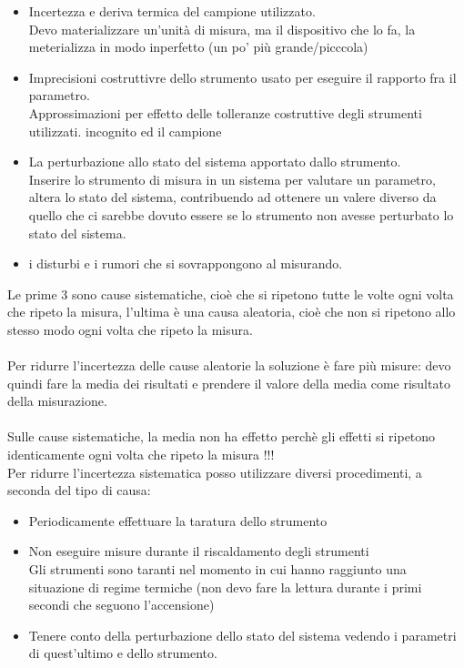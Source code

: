 \documentclass{article}
\begin{document}
\begin{itemize}
    \item Incertezza e deriva termica del campione utilizzato.\\
    Devo materializzare un'unità di misura, ma il dispositivo che lo fa, la meterializza in modo inperfetto (un po' più grande/picccola)
    \item Imprecisioni costruttivre dello strumento usato per eseguire il rapporto fra il parametro. \\
    Approssimazioni per effetto delle tolleranze costruttive degli strumenti utilizzati.
incognito ed il campione 
    \item La perturbazione allo stato del sistema apportato dallo strumento.\\
    Inserire lo strumento di misura in un sistema per valutare un parametro, altera lo stato del sistema, contribuendo ad ottenere un valere diverso da quello che ci sarebbe dovuto essere se lo strumento non avesse perturbato lo stato del sistema.
    \item i disturbi e i rumori che si sovrappongono al misurando.
\end{itemize}
Le prime 3 sono cause sistematiche, cioè che si ripetono tutte le volte ogni volta che ripeto la misura, l’ultima è una causa aleatoria, cioè che non si ripetono allo stesso modo ogni volta che ripeto la misura.\\\\
Per ridurre l'incertezza delle cause aleatorie la soluzione è fare più misure: devo quindi
fare la media dei risultati e prendere il valore della media come risultato della misurazione.\\\\
Sulle cause sistematiche, la media non ha effetto perchè gli effetti si ripetono identicamente ogni volta che ripeto la misura !!! \\
Per ridurre l'incertezza sistematica posso utilizzare diversi procedimenti, a seconda del tipo di causa: 
\begin{itemize}
    \item Periodicamente effettuare la taratura dello strumento
    \item Non eseguire misure durante il riscaldamento degli strumenti\\
    Gli strumenti sono taranti nel momento in cui hanno raggiunto una situazione di regime termiche (non devo fare la lettura durante i primi secondi che seguono l'accensione)
    \item Tenere conto della perturbazione dello stato del sistema vedendo i parametri di 
quest’ultimo e dello strumento.
\end{itemize}
\end{document}
